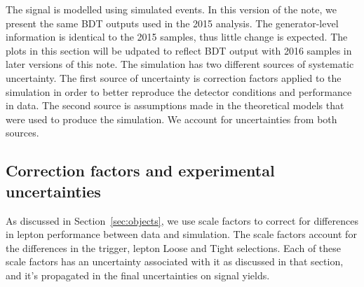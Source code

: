 The signal is modelled using simulated events. In this version of the note,
we present the same BDT outputs used in the 2015 analysis. The generator-level
information is identical to the 2015 samples, thus little change is expected.
The plots in this section will be udpated to reflect BDT output with 2016 samples
in later versions of this note. The simulation has two
different sources of systematic uncertainty. The first source of
uncertainty is correction factors applied to the simulation in
order to better reproduce the detector conditions and performance in
data. The second source is assumptions made in the theoretical
models that were used to produce the simulation. We account for
uncertainties from both sources.

\subsection{Correction factors and experimental uncertainties}

As discussed in Section~\ref{sec:objects}, we use scale factors to
correct for differences in lepton performance between data and
simulation. The scale factors account for the differences
in the trigger, lepton Loose and Tight selections.
Each of these scale factors has an uncertainty associated
with it as discussed in that section, and it's propagated in the final
uncertainties on signal yields.\\



